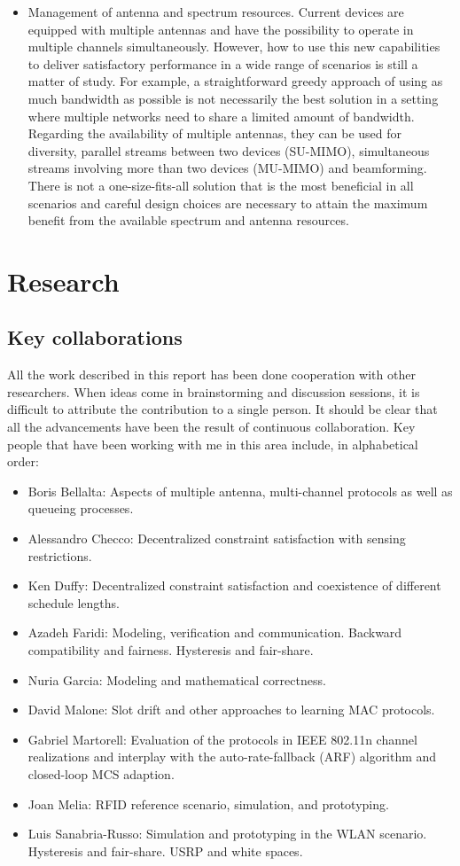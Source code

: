 \documentclass[a4paper,twocolumns]{article}%
\begin{document}
\begin{itemize}
\item Management of antenna and spectrum resources.
Current devices are equipped with multiple antennas and have the possibility to operate in multiple channels simultaneously.
However, how to use this new capabilities to deliver satisfactory performance in a wide range of scenarios is still a matter of study.
For example, a straightforward greedy approach of using as much bandwidth as possible is not necessarily the best solution in a setting where multiple networks need to share a limited amount of bandwidth.
Regarding the availability of multiple antennas, they can be used for diversity, parallel streams between two devices (SU-MIMO), simultaneous streams involving more than two devices (MU-MIMO) and beamforming.
There is not a one-size-fits-all solution that is the most beneficial in all scenarios and careful design choices are necessary to attain the maximum benefit from the available spectrum and antenna resources.
\end{itemize}

\section{Research}

\subsection{Key collaborations}

All the work described in this report has been done cooperation with other researchers.
When ideas come in brainstorming and discussion sessions, it is difficult to attribute the contribution to a single person.
It should be clear that all the advancements have been the result of continuous collaboration.
Key people that have been working with me in this area include, in alphabetical order:
\begin{itemize}
\item Boris Bellalta: Aspects of multiple antenna, multi-channel protocols as well as queueing processes.
\item Alessandro Checco: Decentralized constraint satisfaction with sensing restrictions.
\item Ken Duffy: Decentralized constraint satisfaction and coexistence of different schedule lengths.
\item Azadeh Faridi: Modeling, verification and communication. Backward compatibility and fairness. Hysteresis and fair-share.
\item Nuria Garcia: Modeling and mathematical correctness.
\item David Malone: Slot drift and other approaches to learning MAC protocols.
\item Gabriel Martorell: Evaluation of the protocols in IEEE 802.11n channel realizations and interplay with the auto-rate-fallback (ARF) algorithm and closed-loop MCS adaption.
\item Joan Melia: RFID reference scenario, simulation, and prototyping.
\item Luis Sanabria-Russo: Simulation and prototyping in the WLAN scenario. Hysteresis and fair-share. USRP and white spaces.
\end{itemize}
\end{document}
